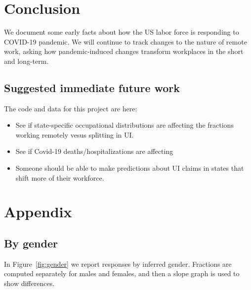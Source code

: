 \documentclass[12pt]{article}
\begin{document}
\section{Conclusion}
We document some early facts about how the US labor force is responding to COVID-19 pandemic.
We will continue to track changes to the nature of remote work, asking how pandemic-induced changes transform workplaces in the short and long-term.

\subsection{Suggested immediate future work} 

The code and data for this project are here: 
\begin{itemize}
\item See if state-specific occupational distributions are affecting the fractions working remotely vesus splitting in UI. 
\item See if Covid-19 deaths/hospitalizations are affecting 
\item Someone should be able to make predictions about UI claims in states that shift more of their workforce.
\end{itemize}


\newpage \clearpage




\appendix

\section{Appendix} 
\subsection{By gender} \label{sec:gender}

In Figure~\ref{fig:gender} we report responses by inferred gender.
Fractions are computed separately for males and females, and then a slope graph is used to show differences. 
\end{document}
